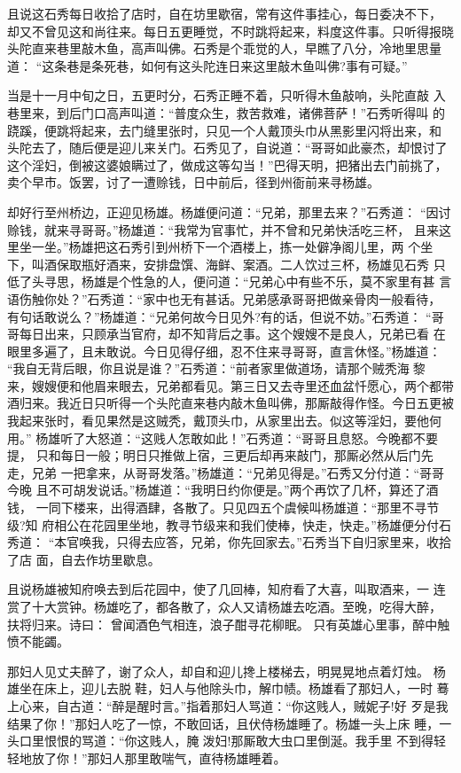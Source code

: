 且说这石秀每日收拾了店时，自在坊里歇宿，常有这件事挂心，每日委决不下，
却又不曾见这和尚往来。每日五更睡觉，不时跳将起来，料度这件事。只听得报晓
头陀直来巷里敲木鱼，高声叫佛。石秀是个乖觉的人，早瞧了八分，冷地里思量道：
“这条巷是条死巷，如何有这头陀连日来这里敲木鱼叫佛?事有可疑。”

当是十一月中旬之日，五更时分，石秀正睡不着，只听得木鱼敲响，头陀直敲
入巷里来，到后门口高声叫道：“普度众生，救苦救难，诸佛菩萨！”石秀听得叫
的跷蹊，便跳将起来，去门缝里张时，只见一个人戴顶头巾从黑影里闪将出来，和
头陀去了，随后便是迎儿来关门。石秀见了，自说道：“哥哥如此豪杰，却恨讨了
这个淫妇，倒被这婆娘瞒过了，做成这等勾当！”巴得天明，把猪出去门前挑了，
卖个早市。饭罢，讨了一遭赊钱，日中前后，径到州衙前来寻杨雄。

却好行至州桥边，正迎见杨雄。杨雄便问道：“兄弟，那里去来？”石秀道：
“因讨赊钱，就来寻哥哥。”杨雄道：“我常为官事忙，并不曾和兄弟快活吃三杯，
且来这里坐一坐。”杨雄把这石秀引到州桥下一个酒楼上，拣一处僻净阁儿里，两
个坐下，叫酒保取瓶好酒来，安排盘馔、海鲜、案酒。二人饮过三杯，杨雄见石秀
只低了头寻思，杨雄是个性急的人，便问道：“兄弟心中有些不乐，莫不家里有甚
言语伤触你处？”石秀道：“家中也无有甚话。兄弟感承哥哥把做亲骨肉一般看待，
有句话敢说么？”杨雄道：“兄弟何故今日见外?有的话，但说不妨。”石秀道：
“哥哥每日出来，只顾承当官府，却不知背后之事。这个嫂嫂不是良人，兄弟已看
在眼里多遍了，且未敢说。今日见得仔细，忍不住来寻哥哥，直言休怪。”杨雄道：
“我自无背后眼，你且说是谁？”石秀道：“前者家里做道场，请那个贼秃海黎
来，嫂嫂便和他眉来眼去，兄弟都看见。第三日又去寺里还血盆忏愿心，两个都带
酒归来。我近日只听得一个头陀直来巷内敲木鱼叫佛，那厮敲得作怪。今日五更被
我起来张时，看见果然是这贼秃，戴顶头巾，从家里出去。似这等淫妇，要他何用。”
杨雄听了大怒道：“这贱人怎敢如此！”石秀道：“哥哥且息怒。今晚都不要提，
只和每日一般；明日只推做上宿，三更后却再来敲门，那厮必然从后门先走，兄弟
一把拿来，从哥哥发落。”杨雄道：“兄弟见得是。”石秀又分付道：“哥哥今晚
且不可胡发说话。”杨雄道：“我明日约你便是。”两个再饮了几杯，算还了酒钱，
一同下楼来，出得酒肆，各散了。只见四五个虞候叫杨雄道：“那里不寻节级?知
府相公在花园里坐地，教寻节级来和我们使棒，快走，快走。”杨雄便分付石秀道：
“本官唤我，只得去应答，兄弟，你先回家去。”石秀当下自归家里来，收拾了店
面，自去作坊里歇息。

且说杨雄被知府唤去到后花园中，使了几回棒，知府看了大喜，叫取酒来，一
连赏了十大赏钟。杨雄吃了，都各散了，众人又请杨雄去吃酒。至晚，吃得大醉，
扶将归来。诗曰：
曾闻酒色气相连，浪子酣寻花柳眠。
只有英雄心里事，醉中触愤不能蠲。

那妇人见丈夫醉了，谢了众人，却自和迎儿搀上楼梯去，明晃晃地点着灯烛。
杨雄坐在床上，迎儿去脱鞋，妇人与他除头巾，解巾帻。杨雄看了那妇人，一时
蓦上心来，自古道：“醉是醒时言。”指着那妇人骂道：“你这贱人，贼妮子!好
歹是我结果了你！”那妇人吃了一惊，不敢回话，且伏侍杨雄睡了。杨雄一头上床
睡，一头口里恨恨的骂道：“你这贱人，腌泼妇!那厮敢大虫口里倒涎。我手里
不到得轻轻地放了你！”那妇人那里敢喘气，直待杨雄睡着。

